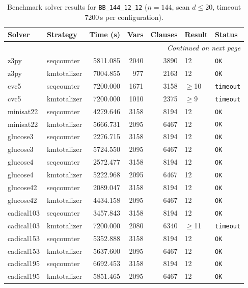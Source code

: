 \begin{longtable}{llrrrl p{}}
\caption{Benchmark solver results for \texttt{BB\_144\_12\_12} ($n=144$, scan $d \leq 20$, timeout 7200\,s per configuration).} \label{tab:bench-BB_144_12_12} \\
\toprule
Solver & Strategy & Time (s) & Vars & Clauses & Result & Status \\
\midrule
\endhead
\midrule
\multicolumn{7}{r}{\textit{Continued on next page}} \\
\midrule
\endfoot
\bottomrule
\endlastfoot
z3py & seqcounter & 5811.085 & 2040 & 3890 & 12 & \texttt{OK} \\
z3py & kmtotalizer & 7004.855 & 977 & 2163 & 12 & \texttt{OK} \\
cvc5 & seqcounter & 7200.000 & 1671 & 3158 & $\geq$10 & \texttt{timeout} \\
cvc5 & kmtotalizer & 7200.000 & 1010 & 2375 & $\geq$9 & \texttt{timeout} \\
minisat22 & seqcounter & 4279.646 & 3158 & 8194 & 12 & \texttt{OK} \\
minisat22 & kmtotalizer & 5666.731 & 2095 & 6467 & 12 & \texttt{OK} \\
glucose3 & seqcounter & 2276.715 & 3158 & 8194 & 12 & \texttt{OK} \\
glucose3 & kmtotalizer & 5724.550 & 2095 & 6467 & 12 & \texttt{OK} \\
glucose4 & seqcounter & 2572.477 & 3158 & 8194 & 12 & \texttt{OK} \\
glucose4 & kmtotalizer & 5222.968 & 2095 & 6467 & 12 & \texttt{OK} \\
glucose42 & seqcounter & 2089.047 & 3158 & 8194 & 12 & \texttt{OK} \\
glucose42 & kmtotalizer & 4434.158 & 2095 & 6467 & 12 & \texttt{OK} \\
cadical103 & seqcounter & 3457.843 & 3158 & 8194 & 12 & \texttt{OK} \\
cadical103 & kmtotalizer & 7200.000 & 2080 & 6340 & $\geq$11 & \texttt{timeout} \\
cadical153 & seqcounter & 5352.888 & 3158 & 8194 & 12 & \texttt{OK} \\
cadical153 & kmtotalizer & 5637.600 & 2095 & 6467 & 12 & \texttt{OK} \\
cadical195 & seqcounter & 6692.453 & 3158 & 8194 & 12 & \texttt{OK} \\
cadical195 & kmtotalizer & 5851.465 & 2095 & 6467 & 12 & \texttt{OK} \\

\end{longtable}
